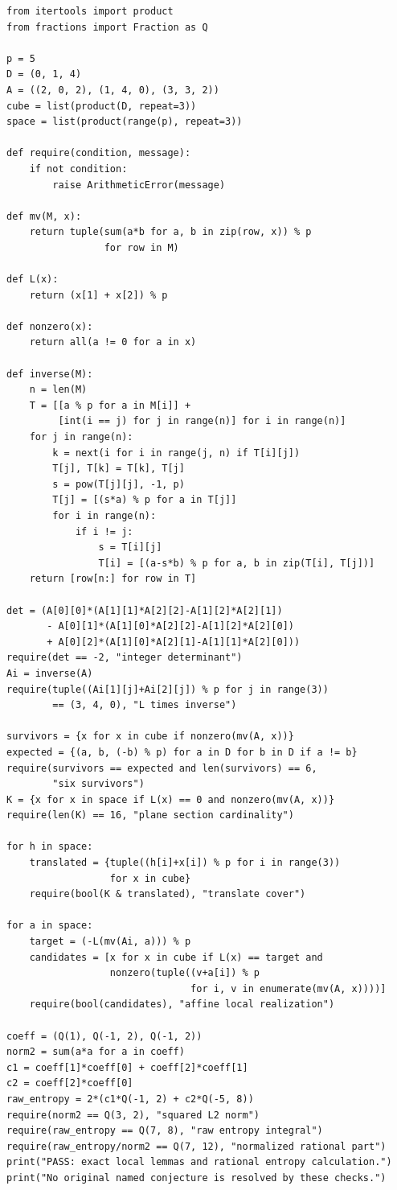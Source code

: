 \documentclass[11pt,a4paper]{article}
\begin{document}
\begin{lstlisting}
from itertools import product
from fractions import Fraction as Q

p = 5
D = (0, 1, 4)
A = ((2, 0, 2), (1, 4, 0), (3, 3, 2))
cube = list(product(D, repeat=3))
space = list(product(range(p), repeat=3))

def require(condition, message):
    if not condition:
        raise ArithmeticError(message)

def mv(M, x):
    return tuple(sum(a*b for a, b in zip(row, x)) % p
                 for row in M)

def L(x):
    return (x[1] + x[2]) % p

def nonzero(x):
    return all(a != 0 for a in x)

def inverse(M):
    n = len(M)
    T = [[a % p for a in M[i]] +
         [int(i == j) for j in range(n)] for i in range(n)]
    for j in range(n):
        k = next(i for i in range(j, n) if T[i][j])
        T[j], T[k] = T[k], T[j]
        s = pow(T[j][j], -1, p)
        T[j] = [(s*a) % p for a in T[j]]
        for i in range(n):
            if i != j:
                s = T[i][j]
                T[i] = [(a-s*b) % p for a, b in zip(T[i], T[j])]
    return [row[n:] for row in T]

det = (A[0][0]*(A[1][1]*A[2][2]-A[1][2]*A[2][1])
       - A[0][1]*(A[1][0]*A[2][2]-A[1][2]*A[2][0])
       + A[0][2]*(A[1][0]*A[2][1]-A[1][1]*A[2][0]))
require(det == -2, "integer determinant")
Ai = inverse(A)
require(tuple((Ai[1][j]+Ai[2][j]) % p for j in range(3))
        == (3, 4, 0), "L times inverse")

survivors = {x for x in cube if nonzero(mv(A, x))}
expected = {(a, b, (-b) % p) for a in D for b in D if a != b}
require(survivors == expected and len(survivors) == 6,
        "six survivors")
K = {x for x in space if L(x) == 0 and nonzero(mv(A, x))}
require(len(K) == 16, "plane section cardinality")

for h in space:
    translated = {tuple((h[i]+x[i]) % p for i in range(3))
                  for x in cube}
    require(bool(K & translated), "translate cover")

for a in space:
    target = (-L(mv(Ai, a))) % p
    candidates = [x for x in cube if L(x) == target and
                  nonzero(tuple((v+a[i]) % p
                                for i, v in enumerate(mv(A, x))))]
    require(bool(candidates), "affine local realization")

coeff = (Q(1), Q(-1, 2), Q(-1, 2))
norm2 = sum(a*a for a in coeff)
c1 = coeff[1]*coeff[0] + coeff[2]*coeff[1]
c2 = coeff[2]*coeff[0]
raw_entropy = 2*(c1*Q(-1, 2) + c2*Q(-5, 8))
require(norm2 == Q(3, 2), "squared L2 norm")
require(raw_entropy == Q(7, 8), "raw entropy integral")
require(raw_entropy/norm2 == Q(7, 12), "normalized rational part")
print("PASS: exact local lemmas and rational entropy calculation.")
print("No original named conjecture is resolved by these checks.")
\end{lstlisting}
\end{document}
